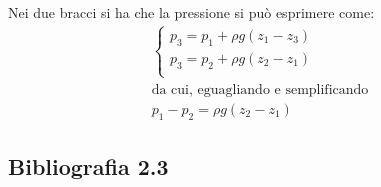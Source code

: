 Nei due bracci si ha che la pressione si può esprimere come:
	\begin{equation*}
		\begin{gathered}
			\left\{ 
			\begin{gathered}
				p_3 = p_1 + \rho g (z_1 - z_3)\\ 
				p_3 = p_2 +\rho g (z_2 - z_1)\\
			\end{gathered} 
			\right. \\
			\text{da cui, eguagliando e semplificando}\\
			p_1 - p_2 = \rho g (z_2 - z_1)
		\end{gathered}
	\end{equation*}

\subsection*{Bibliografia 2.3}
\cite[Cap.\ 3.2, 3.3]{CengelCimbala}\\
\cite[Cap.\ 3.2]{PnueliGutfinger}
